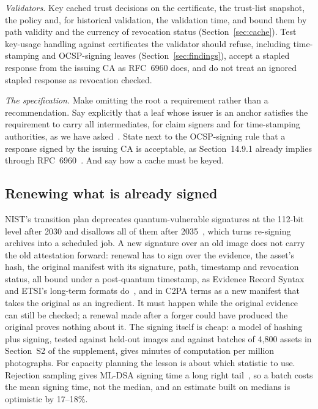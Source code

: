 \emph{Validators.} Key cached trust decisions on the certificate, the
trust-list snapshot, the policy and, for historical validation, the validation
time, and bound them by path validity and the currency of revocation status
(Section~\ref{sec:cache}). Test key-usage handling against certificates the
validator should refuse, including time-stamping and OCSP-signing leaves
(Section~\ref{sec:findings}), accept a stapled response from the issuing CA
as RFC~6960 does, and do not treat an ignored stapled response as revocation
checked.

\emph{The specification.} Make omitting the root a requirement rather than a
recommendation. Say explicitly that a leaf whose issuer is an anchor satisfies
the requirement to carry all intermediates, for claim signers and for
time-stamping authorities, as we have asked~\cite{c2paspec142}. State next to the OCSP-signing rule that a response
signed by the issuing CA is acceptable, as Section~14.9.1 already implies
through RFC~6960~\cite{c2paspec143}. And say how a cache must be keyed.

\subsection{Renewing what is already signed}
\label{sec:renewal}

NIST's transition plan deprecates quantum-vulnerable signatures at the
112-bit level after 2030 and disallows all of them after
2035~\cite{nist_ir8547}, which turns re-signing archives into a scheduled
job. A new signature over an old image does not carry the old
attestation forward: renewal has to sign over the evidence, the asset's hash,
the original manifest with its signature, path, timestamp and revocation
status, all bound under a post-quantum timestamp, as Evidence Record Syntax
and ETSI's long-term formats do~\cite{rfc4998,etsi319102,vigil2015survey}, and
in C2PA terms as a new manifest that takes the original as an ingredient. It
must happen while the original evidence can still be checked; a renewal made
after a forger could have produced the original proves nothing about it. The
signing itself is cheap: a model of hashing plus signing, tested against held-out
images and against batches of 4,800 assets in Section~S2 of the
supplement, gives minutes of computation per million photographs. For
capacity planning the lesson is about which statistic to use. Rejection
sampling gives ML-DSA signing time a long right tail~\cite{riou2026}, so a
batch costs the mean signing time, not the median, and an estimate built on
medians is optimistic by 17--18\%.

